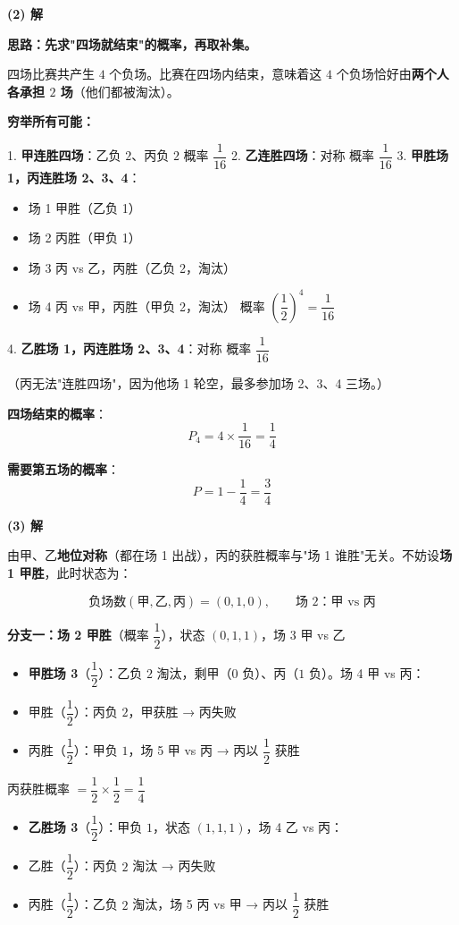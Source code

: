 \textbf{(2) 解}

\textbf{思路：先求"四场就结束"的概率，再取补集。}

四场比赛共产生 $4$ 个负场。比赛在四场内结束，意味着这 $4$ 个负场恰好由\textbf{两个人各承担 $2$ 场}（他们都被淘汰）。

\textbf{穷举所有可能：}

1. \textbf{甲连胜四场}：乙负 $2$、丙负 $2$  概率 $\dfrac1{16}$
2. \textbf{乙连胜四场}：对称  概率 $\dfrac1{16}$
3. \textbf{甲胜场 1，丙连胜场 2、3、4}：
\begin{itemize}
\item 场 1 甲胜（乙负 1）
\item 场 2 丙胜（甲负 1）
\item 场 3 丙 vs 乙，丙胜（乙负 2，淘汰）
\item 场 4 丙 vs 甲，丙胜（甲负 2，淘汰） 概率 $\left(\dfrac12\right)^{4}=\dfrac1{16}$
\end{itemize}
4. \textbf{乙胜场 1，丙连胜场 2、3、4}：对称  概率 $\dfrac1{16}$

（丙无法"连胜四场"，因为他场 1 轮空，最多参加场 2、3、4 三场。）

\textbf{四场结束的概率}：
\[P_4=4\times\frac1{16}=\frac14\]

\textbf{需要第五场的概率}：
\[P=1-\frac14=\frac34\]

\par\medskip

\textbf{(3) 解}

由甲、乙\textbf{地位对称}（都在场 1 出战），丙的获胜概率与"场 1 谁胜"无关。不妨设\textbf{场 1 甲胜}，此时状态为：

\[\text{负场数}(\text{甲},\text{乙},\text{丙})=(0,1,0),\qquad \text{场 2：甲 vs 丙}\]

\textbf{分支一：场 2 甲胜}（概率 $\dfrac12$），状态 $(0,1,1)$，场 3 甲 vs 乙

\begin{itemize}
\item \textbf{甲胜场 3}（$\dfrac12$）：乙负 $2$ 淘汰，剩甲（$0$ 负）、丙（$1$ 负）。场 4 甲 vs 丙：
\item 甲胜（$\dfrac12$）：丙负 $2$，甲获胜 → 丙失败
\item 丙胜（$\dfrac12$）：甲负 $1$，场 5 甲 vs 丙 → 丙以 $\dfrac12$ 获胜
\end{itemize}

  丙获胜概率 $=\dfrac12\times\dfrac12=\dfrac14$

\begin{itemize}
\item \textbf{乙胜场 3}（$\dfrac12$）：甲负 $1$，状态 $(1,1,1)$，场 4 乙 vs 丙：
\item 乙胜（$\dfrac12$）：丙负 $2$ 淘汰 → 丙失败
\item 丙胜（$\dfrac12$）：乙负 $2$ 淘汰，场 5 丙 vs 甲 → 丙以 $\dfrac12$ 获胜
\end{itemize}

